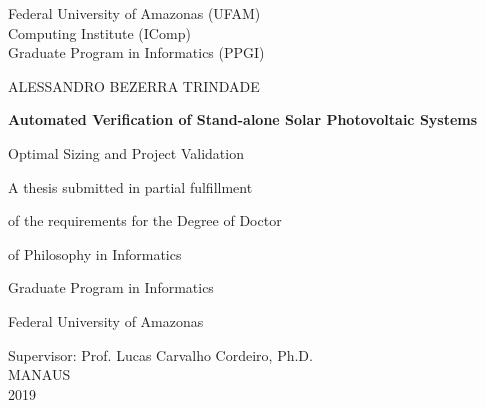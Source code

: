 \begin{titlepage}
    \begin{center}
        \Large
        Federal University of Amazonas (UFAM)\\
        Computing Institute (IComp)\\
		Graduate Program in Informatics (PPGI)\\

        \vspace*{1cm}
        
		\Large
		ALESSANDRO BEZERRA TRINDADE

        \vspace*{2cm}
        		        
        \Huge
        \textbf{Automated Verification of Stand-alone Solar Photovoltaic Systems}
        
        \vspace{0.5cm}
        \LARGE
        Optimal Sizing and Project Validation
        
        \vspace{2cm}
    \end{center}        
    

\hspace{6cm}        A thesis submitted in partial fulfillment

\hspace{6cm}        of the requirements for the Degree of Doctor

\hspace{6cm}        of Philosophy in Informatics

\hspace{6cm}        Graduate Program in Informatics 

\hspace{6cm}        Federal University of Amazonas
        
        \vspace{2cm}
        
        \begin{center}
        Supervisor: Prof. Lucas Carvalho Cordeiro, Ph.D.\\
        \vspace{1cm}
        MANAUS\\
        2019\\
        \end{center}
\end{titlepage}